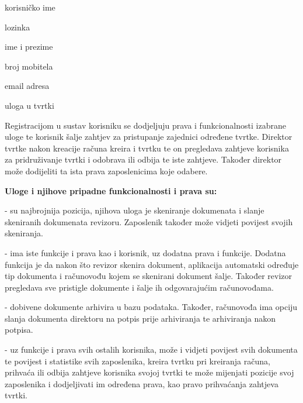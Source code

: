 		\begin{packed_item}
			
			\item  korisničko ime
			\item  lozinka
			\item  ime i prezime
			\item  broj mobitela
			\item  email adresa
			\item  uloga u tvrtki	
			
		\end{packed_item}
	
		Registracijom u sustav korisniku se dodjeljuju prava i funkcionalnosti izabrane uloge te korisnik šalje zahtjev za pristupanje zajednici određene tvrtke. Direktor tvrtke nakon kreacije računa kreira i tvrtku te on pregledava zahtjeve korisnika za pridruživanje tvrtki i odobrava ili odbija te iste zahtjeve. Također direktor može dodijeliti ta ista prava zaposlenicima koje odabere.
		
		\medskip
		\textbf{Uloge i njihove pripadne funkcionalnosti i prava su:}
		
			\begin{packed_item}
		\item{}- su najbrojnija pozicija, njihova uloga je skeniranje dokumenata i slanje skeniranih dokumenata revizoru. Zaposlenik također može vidjeti povijest svojih skeniranja. 
		
		\item{}- ima iste funkcije i prava kao i korisnik, uz dodatna prava i funkcije. Dodatna funkcija je da nakon što revizor skenira dokument, aplikacija automatski određuje tip dokumenta i računovođu kojem se skenirani dokument šalje. Također revizor pregledava sve pristigle dokumente i šalje ih odgovarajućim računovođama.
		
		\item{}- dobivene dokumente arhivira u bazu podataka. Također, računovođa
		 ima opciju slanja dokumenta direktoru na potpis prije arhiviranja te arhiviranja nakon potpisa. 
		
		\item{}- uz funkcije i prava svih ostalih korisnika, može i vidjeti povijest svih dokumenta te povijest i
		statistike svih zaposlenika, kreira tvrtku pri kreiranja računa, prihvaća ili odbija zahtjeve korisnika svojoj tvrtki te može mijenjati pozicije svoj zaposlenika i dodjeljivati im određena prava, kao pravo prihvaćanja zahtjeva tvrtki.
		\end{packed_item}
	
